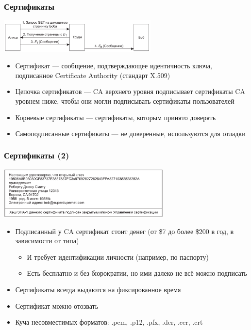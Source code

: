 \documentclass{../cscslides}
\begin{document}
    \begin{frame}
        \frametitle{Сертификаты}
        \begin{center}
            \includegraphics[width=0.6\textwidth]{manInTheMiddle.png}
        \end{center}
        \begin{itemize}
            \item Сертификат --- сообщение, подтверждающее идентичность ключа, подписанное Certificate Authority (стандарт X.509)
            \item Цепочка сертификатов --- CA верхнего уровня подписывает сертификаты CA уровнем ниже, чтобы они могли подписывать сертификаты пользователей
            \item Корневые сертификаты --- сертификаты, которым принято доверять
            \item Самоподписанные сертификаты --- не доверенные, используются для отладки
        \end{itemize}
    \end{frame}

    \begin{frame}
        \frametitle{Сертификаты (2)}
        \begin{center}
            \includegraphics[width=0.65\textwidth]{certificate.png}
        \end{center}
        \begin{itemize}
            \item Подписанный у CA сертификат стоит денег (от \$7 до более \$200 в год, в зависимости от типа)
            \begin{itemize}
                \item И требует идентификации личности (например, по паспорту)
                \item Есть бесплатно и без бюрократии, но ими далеко не всё можно подписать
            \end{itemize}
            \item Сертификаты всегда выдаются на фиксированное время
            \item Сертификат можно отозвать
            \item Куча несовместимых форматов: .pem, .p12, .pfx, .der, .cer, .crt
        \end{itemize}
    \end{frame}
\end{document}
